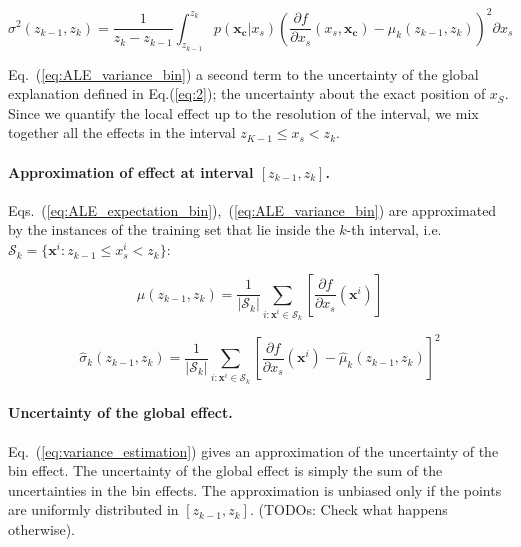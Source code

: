 \documentclass{article}
\begin{document}
\noindent

\begin{equation}
  \label{eq:ALE_variance_bin}
  \sigma^2(z_{k-1}, z_k) = \frac{1}{z_k - z_{k-1}} \int_{z_{k-1}}^{z_k} p(\mathbf{x_c}|x_s)\left (\frac{\partial
      f}{\partial x_s}(x_s, \mathbf{x_c}) - \mu_k(z_{k-1}, z_k) \right )^2 \partial x_s
\end{equation}

\noindent
Eq.~(\ref{eq:ALE_variance_bin}) a second term to the uncertainty of
the global explanation defined in Eq.(\ref{eq:2}); the uncertainty
about the exact position of \(x_S\). Since we quantify the local
effect up to the resolution of the interval, we mix together all the
effects in the interval \(z_{K-1} \leq x_s < z_k\).
\noindent

\paragraph{Approximation of effect at interval \([z_{k-1}, z_k]\).}
Eqs.~(\ref{eq:ALE_expectation_bin}),~(\ref{eq:ALE_variance_bin}) are
approximated by the instances of the training set that lie inside the
\(k\)-th interval, i.e.
\( \mathcal{S}_k = \{ \mathbf{x}^i : z_{k-1} \leq x^i_s < z_{k} \} \):

\begin{equation}
  \label{eq:mean_estimation}
  \hat{\mu}(z_{k-1}, z_k) = \frac{1}{|\mathcal{S}_k|} \sum_{i:\mathbf{x}^i \in
    \mathcal{S}_k} \left [ \frac{\partial f}{\partial x_s}(\mathbf{x}^i) \right ]
\end{equation}

\begin{equation}
  \label{eq:variance_estimation}
  \hat{\sigma}_k(z_{k-1}, z_k) = \frac{1}{|\mathcal{S}_k|} \sum_{i:\mathbf{x}^i \in
  \mathcal{S}_k} \left [ \frac{\partial f}{\partial x_s}(\mathbf{x}^i) - \hat{\mu}_k(z_{k-1}, z_k) \right ]^2
\end{equation}


\paragraph{Uncertainty of the global effect.}

Eq.~(\ref{eq:variance_estimation}) gives an approximation of the
uncertainty of the bin effect. The uncertainty of the global effect is
simply the sum of the uncertainties in the bin effects. The
approximation is unbiased only if the points are uniformly distributed
in \([z_{k-1}, z_k]\). (TODOs: Check what happens otherwise).
\end{document}
